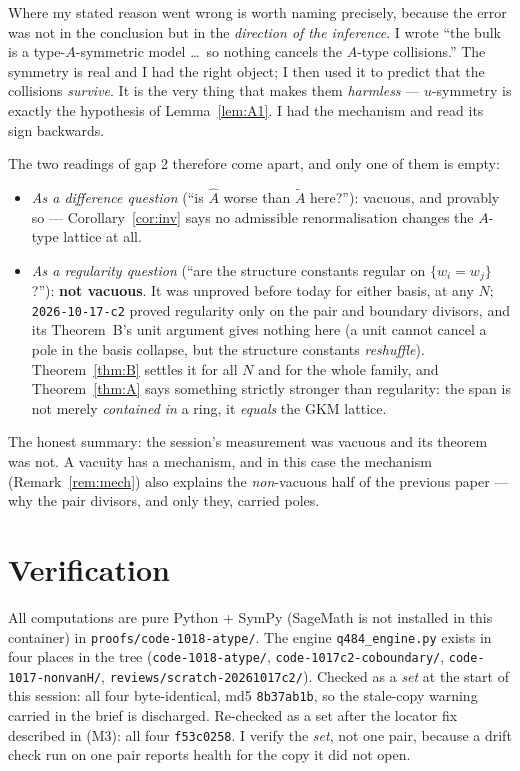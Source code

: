 \documentclass[11pt]{article}
\theoremstyle{plain}
\theoremstyle{definition}
\theoremstyle{remark}
\theoremstyle{plain}
\newcommand{\At}{\widetilde{A}}
\newcommand{\Ah}{\widehat{A}}
\begin{document}
Where my stated reason went wrong is worth naming precisely, because the error
was not in the conclusion but in the \emph{direction of the inference}.  I wrote
``the bulk is a type-$A$-symmetric model \dots\ so nothing cancels the $A$-type
collisions.''  The symmetry is real and I had the right object; I then used it to
predict that the collisions \emph{survive}.  It is the very thing that makes them
\emph{harmless} --- $u$-symmetry is exactly the hypothesis of
Lemma~\ref{lem:A1}.  I had the mechanism and read its sign backwards.

The two readings of gap 2 therefore come apart, and only one of them is empty:
\begin{itemize}
\item \emph{As a difference question} (``is $\Ah$ worse than $\At$ here?''):
  vacuous, and provably so --- Corollary~\ref{cor:inv} says no admissible
  renormalisation changes the $A$-type lattice at all.
\item \emph{As a regularity question} (``are the structure constants regular on
  $\{w_i=w_j\}$?''): \textbf{not vacuous}.  It was unproved before today for
  either basis, at any $N$; \texttt{2026-10-17-c2} proved regularity only on the
  pair and boundary divisors, and its Theorem~B's unit argument gives nothing
  here (a unit cannot cancel a pole in the basis collapse, but the structure
  constants \emph{reshuffle}).  Theorem~\ref{thm:B} settles it for all $N$ and
  for the whole family, and Theorem~\ref{thm:A} says something strictly stronger
  than regularity: the span is not merely \emph{contained in} a ring, it
  \emph{equals} the GKM lattice.
\end{itemize}

The honest summary: the session's measurement was vacuous and its theorem was
not.  A vacuity has a mechanism, and in this case the mechanism
(Remark~\ref{rem:mech}) also explains the \emph{non}-vacuous half of the previous
paper --- why the pair divisors, and only they, carried poles.

\section{Verification}
\label{sec:verif}

\begin{sloppypar}
All computations are pure Python + SymPy (SageMath is not installed in this
container) in \texttt{proofs/code-1018-atype/}.  The engine
\texttt{q484\_engine.py} exists in four places in the tree
(\texttt{code-1018-atype/}, \texttt{code-1017c2-coboundary/},
\texttt{code-1017-nonvanH/}, \texttt{reviews/scratch-20261017c2/}).  Checked as a
\emph{set} at the start of this session: all four byte-identical, md5
\texttt{8b37ab1b}, so the stale-copy warning carried in the brief is discharged.
Re-checked as a set after the locator fix described in (M3): all four
\texttt{f53c0258}.  I verify the \emph{set}, not one pair, because a drift check
run on one pair reports health for the copy it did not open.
\end{sloppypar}
\end{document}
